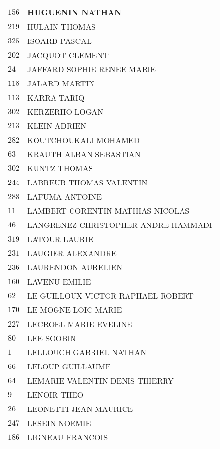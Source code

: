 \begin{xltabular}{\linewidth}{|l|X|}
    \hline
    $156$ & HUGUENIN NATHAN \\
    \hline
    $219$ & HULAIN THOMAS \\
    \hline
    $325$ & ISOARD PASCAL \\
    \hline
    $202$ & JACQUOT CLEMENT \\
    \hline
    $24$ & JAFFARD SOPHIE RENEE MARIE \\
    \hline
    $118$ & JALARD MARTIN \\
    \hline
    $113$ & KARRA TARIQ \\
    \hline
    $302$ & KERZERHO LOGAN \\
    \hline
    $213$ & KLEIN ADRIEN \\
    \hline
    $282$ & KOUTCHOUKALI MOHAMED \\
    \hline
    $63$ & KRAUTH ALBAN SEBASTIAN \\
    \hline
    $302$ & KUNTZ THOMAS \\
    \hline
    $244$ & LABREUR THOMAS VALENTIN \\
    \hline
    $288$ & LAFUMA ANTOINE \\
    \hline
    $11$ & LAMBERT CORENTIN MATHIAS NICOLAS \\
    \hline
    $46$ & LANGRENEZ CHRISTOPHER ANDRE HAMMADI \\
    \hline
    $319$ & LATOUR LAURIE \\
    \hline
    $231$ & LAUGIER ALEXANDRE \\
    \hline
    $236$ & LAURENDON AURELIEN \\
    \hline
    $160$ & LAVENU EMILIE \\
    \hline
    $62$ & LE GUILLOUX VICTOR RAPHAEL ROBERT \\
    \hline
    $170$ & LE MOGNE LOIC MARIE \\
    \hline
    $227$ & LECROEL MARIE EVELINE \\
    \hline
    $80$ & LEE SOOBIN \\
    \hline
    $1$ & LELLOUCH GABRIEL NATHAN \\
    \hline
    $66$ & LELOUP GUILLAUME \\
    \hline
    $64$ & LEMARIE VALENTIN DENIS THIERRY \\
    \hline
    $9$ & LENOIR THEO \\
    \hline
    $26$ & LEONETTI JEAN-MAURICE \\
    \hline
    $247$ & LESEIN NOEMIE \\
    \hline
    $186$ & LIGNEAU FRANCOIS \\

\end{xltabular}

